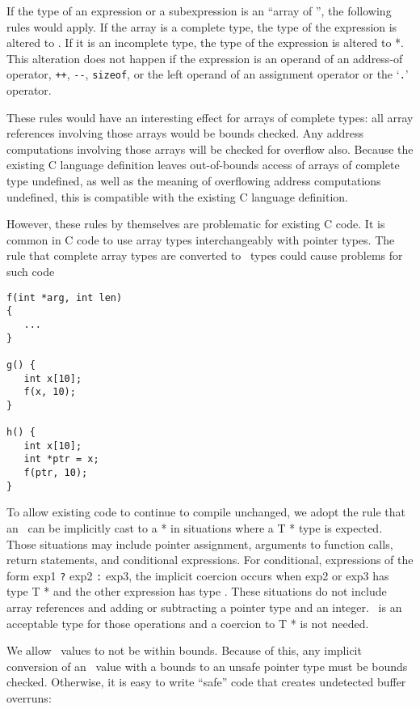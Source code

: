 If the type of an expression or a subexpression is an ``array of
'', the following rules would apply. If the array is a complete
type, the type of the expression is altered to
\arrayptrT . If it is
an incomplete type, the type of the expression is altered to  *.
This alteration does not happen if the expression is an operand of an
address-of operator, \texttt{++}, \texttt{-\/-}, \texttt{sizeof}, or the
left operand of an assignment operator or the `\texttt{.}' operator.

These rules would have an interesting effect for arrays of complete
types: all array references involving those arrays would be bounds
checked. Any address computations involving those arrays will be checked
for overflow also. Because the existing C language definition leaves
out-of-bounds access of arrays of complete type undefined, as well as
the meaning of overflowing address computations undefined, this is
compatible with the existing C language definition.

However, these rules by themselves are problematic for existing C code.
It is common in C code to use array types interchangeably with pointer
types. The rule that complete array types are converted to
\arrayptr\ types could cause problems for such code

\begin{verbatim}
f(int *arg, int len)
{ 
   ...
}

g() {
   int x[10];
   f(x, 10);
}

h() {
   int x[10];
   int *ptr = x;
   f(ptr, 10);
}
\end{verbatim}

To allow existing code to continue to compile unchanged, we adopt the
rule that an \arrayptrT\ can be
implicitly cast to a  * in situations where a T * type is
expected. Those situations may include pointer assignment, arguments to
function calls, return statements, and conditional expressions. For
conditional, expressions of the form exp1 \texttt{?} exp2 \texttt{:}
exp3, the implicit coercion occurs when exp2 or exp3 has type T * and
the other expression has type
\arrayptrT. These situations do not
include array references and adding or subtracting a pointer type and an
integer. \arrayptrT\ is an acceptable
type for those operations and a coercion to T * is not needed.

We allow \arrayptr\ values to not be within bounds. Because of
this, any implicit conversion of an \arrayptr\ value with a
bounds to an unsafe pointer type must be bounds checked. Otherwise, it
is easy to write ``safe'' code that creates undetected buffer overruns:

